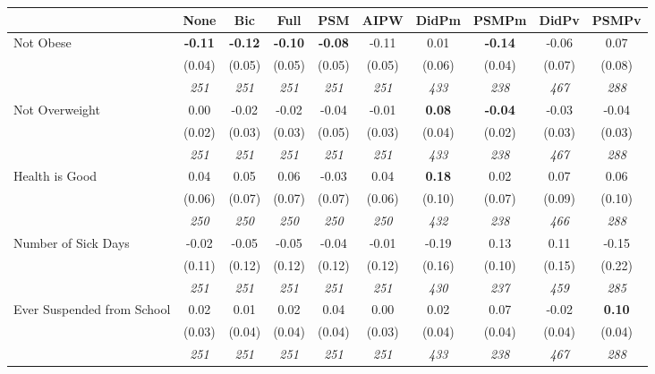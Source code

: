 \begin{tabular}{l c c c c c c c c c}
\toprule
 & None & Bic & Full & PSM & AIPW & DidPm & PSMPm & DidPv & PSMPv \\
\midrule
Not Obese & \textbf{ -0.11 } & \textbf{ -0.12 } & \textbf{ -0.10 } & \textbf{-0.08} & -0.11 & 0.01 & \textbf{-0.14} & -0.06 & 0.07 \\
& (0.04) & (0.05) & (0.05) & (0.05) & (0.05) & (0.06) & (0.04) & (0.07) & (0.08) \\
& \textit{ 251 } & \textit{ 251 } & \textit{ 251 } & \textit{ 251 } & \textit{ 251 } & \textit{ 433 } & \textit{ 238 } & \textit{ 467 } & \textit{ 288 } \\
Not Overweight & 0.00 & -0.02 & -0.02 & -0.04 & -0.01 & \textbf{ 0.08 } & \textbf{-0.04} & -0.03 & -0.04 \\
& (0.02) & (0.03) & (0.03) & (0.05) & (0.03) & (0.04) & (0.02) & (0.03) & (0.03) \\
& \textit{ 251 } & \textit{ 251 } & \textit{ 251 } & \textit{ 251 } & \textit{ 251 } & \textit{ 433 } & \textit{ 238 } & \textit{ 467 } & \textit{ 288 } \\
Health is Good & 0.04 & 0.05 & 0.06 & -0.03 & 0.04 & \textbf{ 0.18 } & 0.02 & 0.07 & 0.06 \\
& (0.06) & (0.07) & (0.07) & (0.07) & (0.06) & (0.10) & (0.07) & (0.09) & (0.10) \\
& \textit{ 250 } & \textit{ 250 } & \textit{ 250 } & \textit{ 250 } & \textit{ 250 } & \textit{ 432 } & \textit{ 238 } & \textit{ 466 } & \textit{ 288 } \\
Number of Sick Days & -0.02 & -0.05 & -0.05 & -0.04 & -0.01 & -0.19 & 0.13 & 0.11 & -0.15 \\
& (0.11) & (0.12) & (0.12) & (0.12) & (0.12) & (0.16) & (0.10) & (0.15) & (0.22) \\
& \textit{ 251 } & \textit{ 251 } & \textit{ 251 } & \textit{ 251 } & \textit{ 251 } & \textit{ 430 } & \textit{ 237 } & \textit{ 459 } & \textit{ 285 } \\
Ever Suspended from School & 0.02 & 0.01 & 0.02 & 0.04 & 0.00 & 0.02 & 0.07 & -0.02 & \textbf{0.10} \\
& (0.03) & (0.04) & (0.04) & (0.04) & (0.03) & (0.04) & (0.04) & (0.04) & (0.04) \\
& \textit{ 251 } & \textit{ 251 } & \textit{ 251 } & \textit{ 251 } & \textit{ 251 } & \textit{ 433 } & \textit{ 238 } & \textit{ 467 } & \textit{ 288 } \\
\bottomrule
\end{tabular}
